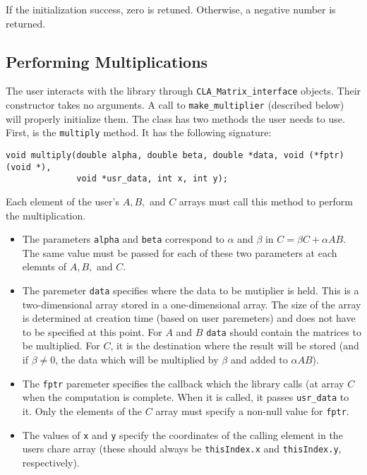 If the initialization success, zero is retuned. Otherwise, a negative number
is returned.

\subsection{Performing Multiplications}

The user interacts with the library through {\tt CLA\_Matrix\_interface}
objects. Their constructor takes no arguments. A call to {\tt make\_multiplier}
(described below) will properly initialize them. The class has two methods
the user needs to use. First, is the {\tt multiply} method. It has the
following signature:
\begin{verbatim}
void multiply(double alpha, double beta, double *data, void (*fptr) (void *),
              void *usr_data, int x, int y);
\end{verbatim}
Each element of the user's $A, B,$ and $C$ arrays must call this method to
perform the multiplication.
\begin{itemize}

\item The parameters {\tt alpha} and {\tt beta} correspond to $\alpha$ and
$\beta$ in $C = \beta C + \alpha AB$. The same value must be passed for each
of these two parameters at each elemnts of $A, B,$ and $C$.

\item The paremeter {\tt data} specifies where the data to be mutiplier is
held. This is a two-dimensional array stored in a one-dimensional array. The
size of the array is determined at creation time (based on user paremeters)
and does not have to be specified at this point. For $A$ and $B$ {\tt data}
should contain the matrices to be multiplied. For $C$, it is the destination
where the result will be stored (and if $\beta \neq 0$, the data which will
be multiplied by $\beta$ and added to $\alpha AB$).

\item The {\tt fptr} paremeter specifies the
callback which the library calls (at array $C$ when the computation is
complete. When it is called, it passes {\tt usr\_data} to it. Only
the elements of the $C$ array must specify a non-null value for {\tt fptr}.

\item The values of {\tt x} and {\tt y} specify the coordinates of the calling
element in the users chare array (these should always be {\tt thisIndex.x} and
{\tt thisIndex.y}, respectively).

\end{itemize}

